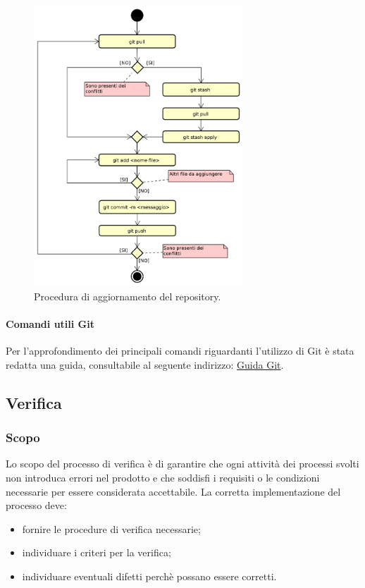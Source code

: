 	  \begin{figure}[H]
	  	\centering
	  	\includegraphics[width=0.7\textwidth]{img/AggiornamentoRepository}
	  	\caption{Procedura di aggiornamento del repository.}
	  \end{figure}
	  \paragraph{Comandi utili Git}
	  Per l'approfondimento dei principali comandi riguardanti l'utilizzo di Git è stata redatta una guida, consultabile al seguente indirizzo: \href{https://github.com/JordanGottardo/Documenti/blob/master/README.md}{Guida Git}.
	
    \subsection{Verifica}\label{sec:verifica}
        \subsubsection{Scopo}
        Lo scopo del processo di verifica è di garantire che ogni attività dei processi svolti non introduca errori nel prodotto e che soddisfi i requisiti o le condizioni necessarie per essere considerata accettabile. La corretta implementazione del processo deve:
        \begin{itemize}
            \item fornire le procedure di verifica necessarie;
            \item individuare i criteri per la verifica;
            \item individuare eventuali difetti perchè possano essere corretti.
        \end{itemize}

